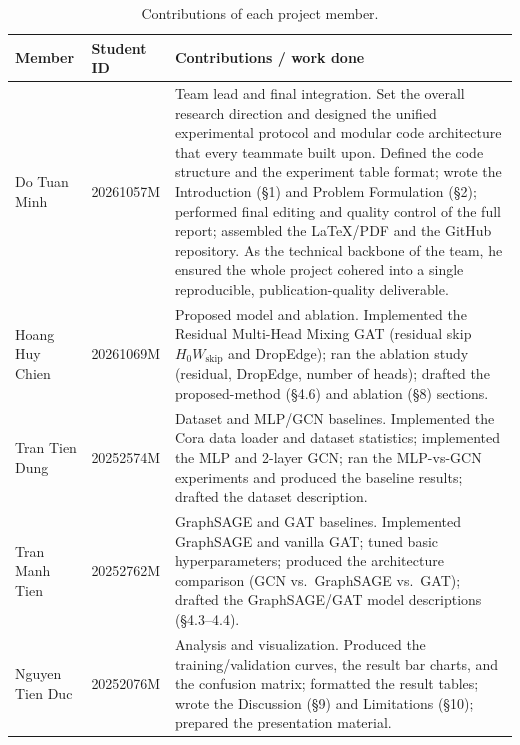 \documentclass{article}
\begin{document}
\begin{table}[h]
  \centering
  \caption{Contributions of each project member.}
  \label{tab:contrib}
  \small
  \begin{tabular}{p{3.4cm}p{2.0cm}p{8.3cm}}
    \toprule
    Member & Student ID & Contributions / work done \\
    \midrule
    Do Tuan Minh & 20261057M &
      Team lead and final integration. Set the overall research direction and designed
      the unified experimental protocol and modular code architecture that every
      teammate built upon. Defined the code structure and the experiment table format;
      wrote the Introduction (\S1) and Problem Formulation (\S2); performed final
      editing and quality control of the full report; assembled the LaTeX/PDF and the
      GitHub repository. As the technical backbone of the team, he ensured the whole
      project cohered into a single reproducible, publication-quality deliverable. \\
    \addlinespace
    Hoang Huy Chien & 20261069M &
      Proposed model and ablation. Implemented the Residual Multi-Head Mixing GAT
      (residual skip $H_0 W_{\text{skip}}$ and DropEdge); ran the ablation study
      (residual, DropEdge, number of heads); drafted the proposed-method (\S4.6) and
      ablation (\S8) sections. \\
    \addlinespace
    Tran Tien Dung & 20252574M &
      Dataset and MLP/GCN baselines. Implemented the Cora data loader and dataset
      statistics; implemented the MLP and 2-layer GCN; ran the MLP-vs-GCN experiments
      and produced the baseline results; drafted the dataset description. \\
    \addlinespace
    Tran Manh Tien & 20252762M &
      GraphSAGE and GAT baselines. Implemented GraphSAGE and vanilla GAT; tuned basic
      hyperparameters; produced the architecture comparison (GCN vs.\ GraphSAGE vs.\
      GAT); drafted the GraphSAGE/GAT model descriptions (\S4.3--4.4). \\
    \addlinespace
    Nguyen Tien Duc & 20252076M &
      Analysis and visualization. Produced the training/validation curves, the result
      bar charts, and the confusion matrix; formatted the result tables; wrote the
      Discussion (\S9) and Limitations (\S10); prepared the presentation material. \\
    \bottomrule
  \end{tabular}
\end{table}

{\small


}
\end{document}
